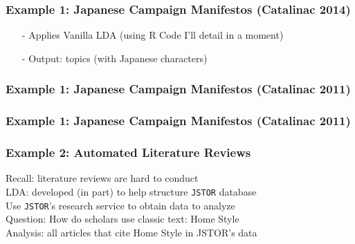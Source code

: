 \documentclass{beamer}
\numberwithin{equation}{section}
\begin{document}
\begin{frame}
\frametitle{Example 1:  Japanese Campaign Manifestos (Catalinac 2014)}

\begin{itemize}
\item[-] Applies Vanilla LDA (using R Code I'll detail in a moment) 
\item[-] Output: topics (with Japanese characters)
\end{itemize}

\end{frame}


\begin{frame}
\frametitle{Example 1: Japanese Campaign Manifestos (Catalinac 2011)}


\end{frame}


\begin{frame}
\frametitle{Example 1: Japanese Campaign Manifestos (Catalinac 2011)}


\end{frame}


\begin{frame}



\end{frame}




\begin{frame}
\frametitle{Example 2: Automated Literature Reviews} 

\alert{Recall}: literature reviews are hard to conduct\\
\alert{LDA}: developed (in part) to help structure {\tt JSTOR} database\\
Use {\tt JSTOR}'s research service to obtain data to analyze\\
\alert{Question:} How do scholars use classic text: \alert{Home Style}\\
Analysis: all articles that cite \alert{Home Style} in JSTOR's data\\

\end{frame}
\end{document}
